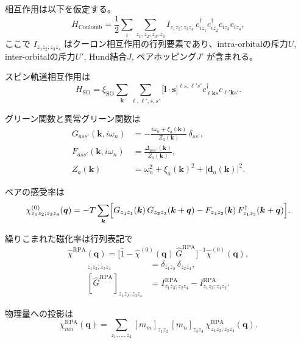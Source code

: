 \documentclass[a4paper,11pt]{jsarticle}
\begin{document}
相互作用は以下を仮定する。
\begin{equation}
H_{\mathrm{Coulomb}} = \frac{1}{2} \sum_{i} \sum_{z_1,z_2,z_3,z_4}
I_{z_1 z_2; z_3 z_4} \,
c^{\dagger}_{i z_1} c^{\dagger}_{i z_2} c_{i z_3} c_{i z_4},
\end{equation}
ここで $I_{z_1 z_2; z_3 z_4}$ はクーロン相互作用の行列要素であり、intra-orbitalの斥力$U$, inter-orbitalの斥力$U'$, Hund結合$J$, ペアホッピング$J'$ が含まれる。

スピン軌道相互作用は
\begin{equation}
H_{\mathrm{SO}} = \xi_{\mathrm{SO}}
\sum_{\bm{k}} \sum_{\ell,\ell',s,s'}
\bigl[\bm{l}\cdot\bm{s}\bigr]^{\ell s,\ell' s'}
c^\dagger_{\ell \bm{k} s} c_{\ell' \bm{k} s'}.
\end{equation}

グリーン関数と異常グリーン関数は
\begin{align}
G_{a s s'}(\bm{k}, i\omega_n) &= -\frac{i\omega_n + \xi_a(\bm{k})}{Z_a(\bm{k})} \,\delta_{s s'},\\
F_{a s s'}(\bm{k}, i\omega_n) &= \frac{\Delta_{a s s'}(\bm{k})}{Z_a(\bm{k})},\\
Z_a(\bm{k}) &= \omega_n^2 + \xi_a(\bm{k})^2 + \lvert \bm{d}_a(\bm{k}) \rvert^2.
\end{align}

ベアの感受率は
\begin{equation}
\chi^{(0)}_{z_1 z_2; z_3 z_4}(\bm{q})
= -T \sum_{\bm{k}}
\Bigl[
G_{z_4 z_1}(\bm{k})\,G_{z_2 z_3}(\bm{k} + \bm{q})
- F_{z_4 z_2}(\bm{k})\,F^\dagger_{z_1 z_3}(\bm{k} + \bm{q})
\Bigr].
\end{equation}

繰りこまれた磁化率は行列表記で
\begin{equation}
\hat{\chi}^{\mathrm{RPA}}(\bm{q})
= \bigl[\hat{1} - \hat{\chi}^{(0)}(\bm{q})\,\hat{G}^{\mathrm{RPA}}\bigr]^{-1}
  \hat{\chi}^{(0)}(\bm{q}),
\end{equation}
\begin{align}
[\hat{1}]_{z_1 z_2; z_3 z_4}
&= \delta_{z_1 z_3}\,\delta_{z_2 z_4},\\
[\hat{G}^{\mathrm{RPA}}]_{z_1 z_2; z_3 z_4}
&= I^{\mathrm{RPA}}_{z_1 z_3; z_2 z_4}
- I^{\mathrm{RPA}}_{z_1 z_3; z_4 z_2}.
\end{align}

物理量への投影は
\begin{equation}
\chi^{\mathrm{RPA}}_{mn}(\bm{q})
= \sum_{z_1,\dots,z_4}
[m_m]_{z_1 z_2}\,[m_n]_{z_3 z_4}\,
\chi^{\mathrm{RPA}}_{z_1 z_2; z_3 z_4}(\bm{q}).
\end{equation}
\end{document}
